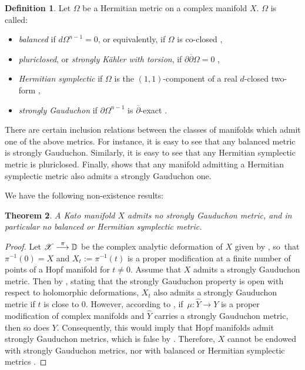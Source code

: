 \documentclass[JEP,XML,SOM,Unicode,NoFloatCountersInSection]{cedram}
\let\mathcal\mathscr
\newtheorem{theorem}{Theorem}[section]
\theoremstyle{definition}
\newtheorem{definition}[theorem]{Definition}
\newcommand{\To}[1]{\mathchoice{\xrightarrow{\textstyle\kern4pt#1\kern3pt}}{\stackrel{#1}{\longrightarrow}}{}{}}
\begin{document}
\begin{definition} Let $\Omega$ be a Hermitian metric on a complex manifold $X$. $\Omega$ is called:
\begin{itemize}
\item \emph{balanced} if $d\Omega^{n-1}=0$, or equivalently, if $\Omega$ is co-closed \cite{mic},
\item \emph{pluriclosed}, or \emph{strongly Kähler with torsion}, if $\partial \overline{\partial}\Omega=0$ \cite{bis},
\item \emph{Hermitian symplectic} if $\Omega$ is the $(1,1)$-component of a real $d$-closed two-form \cite{st},
\item \emph{strongly Gauduchon} if $\partial\Omega^{n-1}$ is $\overline{\partial}$-exact \cite{P9}.
\end{itemize}
\end{definition}

There are certain inclusion relations between the classes of manifolds which admit one of the above metrics. For instance, it is easy to see that any balanced metric is strongly Gauduchon. Similarly, it is easy to see that any Hermitian symplectic metric is pluriclosed. Finally, \cite[Lem.\,1]{yzz} shows that any manifold admitting a Hermitian symplectic metric also admits a strongly Gauduchon one.

We have the following non-existence results:
\begin{theorem}\label{balanced}
A Kato manifold $X$ admits no strongly Gauduchon metric, and in particular no balanced or Hermitian symplectic metric.
\end{theorem}

\begin{proof}
Let $\mathcal{X}\To{\pi} \mathbb{D}$ be the complex analytic deformation of $X$ given by \cite[Th.\,1]{kato}, so~that $\pi^{-1}(0)=X$ and $X_t:=\pi^{-1}(t)$ is a proper modification at a finite number of points of a Hopf manifold for $t\neq 0$. Assume that $X$ admits a strongly Gauduchon metric. Then by \cite[Th.\,3.1]{P14}, stating that the strongly Gauduchon property is open with respect to holomorphic deformations, $X_t$ also admits a strongly Gauduchon metric if $t$ is close to $0$. However, according to \cite[Th.\,2.2]{P10b}, if~\hbox{$\mu: \hat{Y}\!\to\!Y$} is a proper modification of complex manifolds and $\hat{Y}$ carries a strongly Gauduchon metric, then so does $Y$. Consequently, this would imply that Hopf manifolds admit strongly Gauduchon metrics, which is false by \cite[\S 2]{P14}. Therefore, $X$ cannot be endowed with strongly Gauduchon metrics, nor with balanced or Hermitian symplectic metrics \cite[Lem.\,1]{yzz}.
\end{proof}
\end{document}
